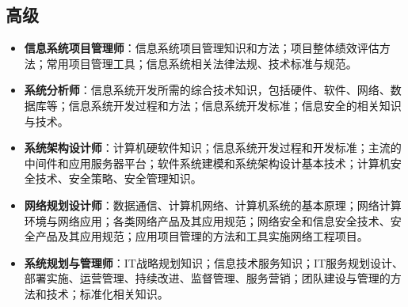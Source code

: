 \subsection{高级}
\begin{itemize}
\item \textbf{信息系统项目管理师}：信息系统项目管理知识和方法；项目整体绩效评估方法；常用项目管理工具；信息系统相关法律法规、技术标准与规范。
\item \textbf{系统分析师}：信息系统开发所需的综合技术知识，包括硬件、软件、网络、数据库等；信息系统开发过程和方法；信息系统开发标准；信息安全的相关知识与技术。
\item \textbf{系统架构设计师}：计算机硬软件知识；信息系统开发过程和开发标准；主流的中间件和应用服务器平台；软件系统建模和系统架构设计基本技术；计算机安全技术、安全策略、安全管理知识。
\item \textbf{网络规划设计师}：数据通信、计算机网络、计算机系统的基本原理；网络计算环境与网络应用；各类网络产品及其应用规范；网络安全和信息安全技术、安全产品及其应用规范；应用项目管理的方法和工具实施网络工程项目。
\item \textbf{系统规划与管理师}：IT战略规划知识；信息技术服务知识；IT服务规划设计、部署实施、运营管理、持续改进、监督管理、服务营销；团队建设与管理的方法和技术；标准化相关知识。
\end{itemize}
